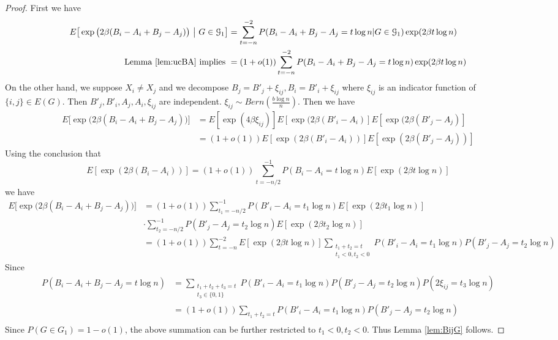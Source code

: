 \documentclass{article}
\begin{document}
\begin{proof}
First we have
\begin{align}
E \big[  \exp\big(2\beta (B_i-A_i + B_j - A_j) \big) ~\big|~ G\in\mathcal{G}_1 \big] 
&= \sum_{t=-n}^{-2} P(B_i -A_i + B_j - A_j = t\log n | G \in \mathcal{G}_1) \exp(2\beta t \log n) \notag \\
\text{ Lemma \ref{lem:ucBA} implies }&= (1+o(1))\sum_{t=-n}^{-2} P(B_i -A_i + B_j - A_j = t\log n) \exp(2\beta t \log n)
\end{align}
On the other hand, we suppose $X_i \neq X_j$ and we decompose $B_j = B'_j + \xi_{ij}, B_i = B'_i + \xi_{ij}$ where $\xi_{ij}$ is an indicator function of $\{i,j\} \in E(G)$. Then $B'_j, B'_i, A_j, A_i, \xi_{ij}$ are independent.
$\xi_{ij} \sim Bern(\frac{b\log n}{n})$.
Then we have
\begin{align*}
E \big[  \exp\big(2\beta (B_i-A_i + B_j - A_j) \big) \big] & = E[\exp(4\beta \xi_{ij})] E[\exp(2\beta (B'_i - A_i)]
E[\exp(2\beta (B'_j - A_j)] \\
& = (1+o(1))E[\exp(2\beta(B'_i - A_i))] E[\exp(2\beta(B'_j - A_j))]
\end{align*}
Using the conclusion that
$$
E[\exp(2\beta(B_i - A_i))] = (1+o(1)) \sum_{t=-n/2}^{-1} P(B_i - A_i = t \log n)E[\exp(2\beta t \log n)]
$$
we have
\begin{align*}
E \big[  \exp\big(2\beta (B_i-A_i + B_j - A_j) \big) \big] & = (1+o(1))
\sum_{t_1=-n/2}^{-1} P(B'_i - A_i = t_1 \log n)E[\exp(2\beta t_1 \log n)] \\
& \cdot
\sum_{t_2=-n/2}^{-1} P(B'_j - A_j = t_2 \log n)E[\exp(2\beta t_2 \log n)] \\
& = (1+o(1))  \sum_{t=-n}^{-2} E[\exp(2\beta t \log n)]\sum_{\substack{t_1 + t_2 = t \\ t_1 < 0, t_2 < 0}} P(B'_i - A_i = t_1 \log n) P(B'_j - A_j = t_2\log n)
\end{align*}
Since 
\begin{align*}
P(B_i -A_i + B_j - A_j = t\log n)
&= \sum_{\substack{t_1 + t_2 + t_3 = t\\ t_3 \in\{0, 1\}}} P(B'_i - A_i = t_1 \log n) P(B'_j - A_j = t_2 \log n) P(2\xi_{ij} = t_3 \log n) \\
&=(1+o(1)) \sum_{t_1 + t_2 = t} P(B'_i - A_i = t_1 \log n) P(B'_j - A_j = t_2 \log n)  \\
\end{align*}
Since $P(G\in G_1) = 1-o(1)$, the above summation can be further restricted to $t_1 < 0, t_2 < 0$. Thus Lemma \ref{lem:BijG} follows. 
\end{proof}
\end{document}
